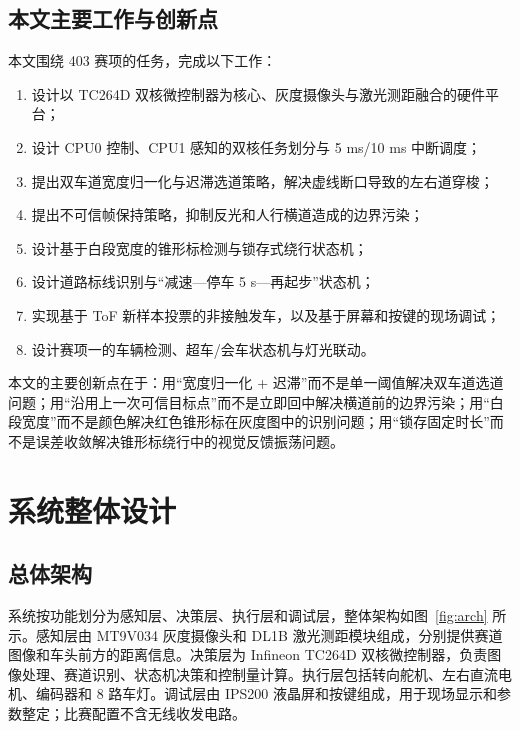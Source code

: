 \documentclass{MaiTechReport}
\begin{document}
\subsection{本文主要工作与创新点}
本文围绕 403 赛项的任务，完成以下工作：
\begin{enumerate}
  \item 设计以 TC264D 双核微控制器为核心、灰度摄像头与激光测距融合的硬件平台；
  \item 设计 CPU0 控制、CPU1 感知的双核任务划分与 5 ms/10 ms 中断调度；
  \item 提出双车道宽度归一化与迟滞选道策略，解决虚线断口导致的左右道穿梭；
  \item 提出不可信帧保持策略，抑制反光和人行横道造成的边界污染；
  \item 设计基于白段宽度的锥形标检测与锁存式绕行状态机；
  \item 设计道路标线识别与“减速—停车 5 s—再起步”状态机；
  \item 实现基于 ToF 新样本投票的非接触发车，以及基于屏幕和按键的现场调试；
  \item 设计赛项一的车辆检测、超车/会车状态机与灯光联动。
\end{enumerate}

本文的主要创新点在于：用“宽度归一化 + 迟滞”而不是单一阈值解决双车道选道问题；用“沿用上一次可信目标点”而不是立即回中解决横道前的边界污染；用“白段宽度”而不是颜色解决红色锥形标在灰度图中的识别问题；用“锁存固定时长”而不是误差收敛解决锥形标绕行中的视觉反馈振荡问题。

\section{系统整体设计}
\label{sec:overall}

\subsection{总体架构}
系统按功能划分为感知层、决策层、执行层和调试层，整体架构如图~\ref{fig:arch} 所示。感知层由 MT9V034 灰度摄像头和 DL1B 激光测距模块组成，分别提供赛道图像和车头前方的距离信息。决策层为 Infineon TC264D 双核微控制器，负责图像处理、赛道识别、状态机决策和控制量计算。执行层包括转向舵机、左右直流电机、编码器和 8 路车灯。调试层由 IPS200 液晶屏和按键组成，用于现场显示和参数整定；比赛配置不含无线收发电路。
\end{document}
